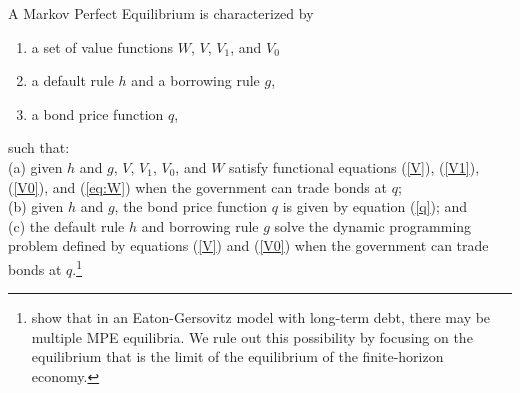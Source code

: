 \begin{definition}
A Markov Perfect Equilibrium is characterized by
\end{definition}

\begin{enumerate}
\item a set of value functions $W$, $V$, $V_1$, and $V_0$

\item a default rule $h$ and a borrowing rule $g$,

\item a bond price function $q$,

\end{enumerate}

such that: \\

\indent(a) given $h$ and $g$, $V$, $V_1$, $V_0$, and $W$
satisfy functional equations  (\ref{V}),  (\ref{V1}), (\ref{V0}), and (\ref{eq:W}) when the government can trade bonds at $q$; \\

\indent(b) given $h$ and $g$, the bond price
function $q$ is given by equation (\ref{q}); and\\

\indent(c) the default rule $h$ and borrowing rule $g$ solve the
dynamic programming problem defined by equations (\ref{V}) and
(\ref{V0}) when the government can trade bonds at $q$.\footnote{\cite{AguiarAmador2020} show that in an Eaton-Gersovitz model with long-term debt, there may be multiple MPE equilibria. We rule out this possibility by focusing on the equilibrium that is the limit of the equilibrium of the finite-horizon economy.}

%
%

